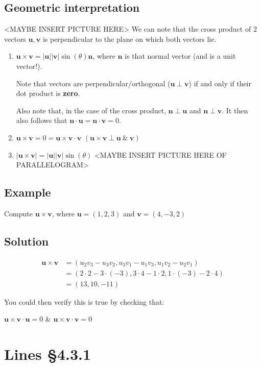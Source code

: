 \documentclass[11pt]{article}
\renewcommand{\vec}[1]{\mathbf{#1}}
\begin{document}
\subsection{Geometric interpretation}
<MAYBE INSERT PICTURE HERE>
We can note that the cross product of 2 vectors $\vec{u}, \vec{v}$ is perpendicular to the plane on which both vectors lie.
\begin{enumerate}[ a) ]
\item $\vec{u} \times \vec{v} = |\vec{u}||\vec{v}| \sin(\theta)\vec{n}$, where $\vec{n}$ is that normal vector (and is a unit vector!).

Note that vectors are perpendicular/orthogonal ($\vec{u} \perp \vec{v}$) if and only if their dot product is \textbf{zero}. 

Also note that, in the case of the cross product, $\vec{n} \perp \vec{u}$ and $\vec{n} \perp \vec{v}$. It then also follows that $\vec{n} \cdot \vec{u} = \vec{n} \cdot \vec{v} = 0$.
\item $\vec{u} \times \vec{v} = 0 = \vec{u} \times \vec{v} \cdot \vec{v}$\hspace{2cm} $(\vec{u} \times \vec{v} \perp \vec{u}\ \&\ \vec{v})$
\item $|\vec{u} \times \vec{v}| = |\vec{u}||\vec{v}|\sin(\theta)$ <MAYBE INSERT PICTURE HERE OF PARALLELOGRAM>
\end{enumerate}

\subsection{Example}
Compute $\vec{u} \times \vec{v}$, where $\vec{u}=(1,2,3)$ and $\vec{v} = (4, -3, 2)$

\subsection{Solution}
\begin{align*}
\vec{u} \times \vec{v} &= (u_2v_3 - u_3v_2, u_3v_1 - u_1v_3, u_1v_2 - u_2v_1) \\ 
&= (2 \cdot 2 - 3 \cdot (-3), 3 \cdot 4 - 1 \cdot 2, 1 \cdot (-3) - 2 \cdot 4) \\
&= (13, 10, -11)
\end{align*}

You could then verify this is true by checking that:

$\vec{u} \times \vec{v} \cdot \vec{u} = 0$ \& $\vec{u} \times \vec{v} \cdot \vec{v} = 0$

\section{Lines §4.3.1}
\end{document}
